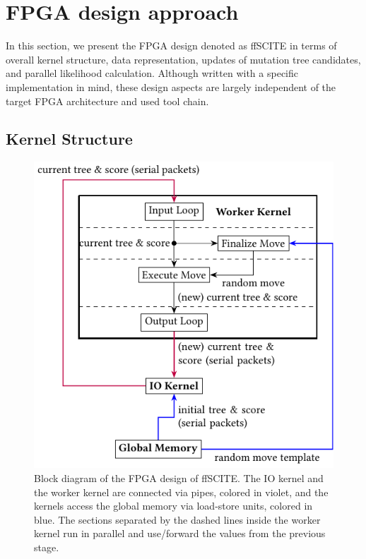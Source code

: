 \section{FPGA design approach}
\label{sec:approach}

In this section, we present the \ac{FPGA} design denoted as \ac{ffSCITE} in terms of overall kernel structure, data representation, updates of mutation tree candidates, and parallel likelihood calculation. Although written with a specific implementation in mind, these design aspects are largely independent of the target FPGA architecture and used tool chain.

\subsection{Kernel Structure}
\label{sec:kernel_structure}

\begin{figure}[tbh]
    \includegraphics{figures/design.pdf}
    \caption{Block diagram of the \acs{FPGA} design of \acs{ffSCITE}. The IO kernel and the worker kernel are connected via pipes, colored in violet, and the kernels access the global memory via load-store units, colored in blue. The sections separated by the dashed lines inside the worker kernel run in parallel and use/forward the values from the previous stage.}
    \label{fig:design}
\end{figure}

